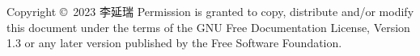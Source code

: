 \blank[line]
\vfill
Copyright \copyright\  2023  李延瑞
\blank
Permission is granted to copy, distribute and/or modify this document under the terms of the GNU Free Documentation License, Version 1.3 or any later version published by the Free Software Foundation.
\stopstandardmakeup
